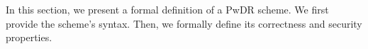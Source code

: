 %
%
%
%
%  
%  
%  
%    
%   
%
%     
%
%
%


In this section, we present a formal definition of a  PwDR scheme. We first provide the scheme's syntax.  Then, we   formally define its correctness  and security properties. 


